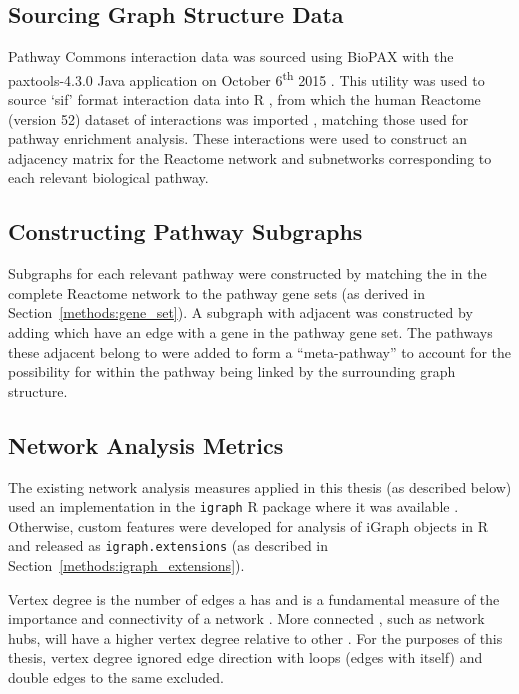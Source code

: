 \subsection{Sourcing Graph Structure Data} \label{methods:graph_data}
Pathway Commons interaction data was sourced using \gls{BioPAX} with the paxtools-4.3.0 Java application on October 6\textsuperscript{th} 2015 \citep{PathwayCommons, paxtools}. This utility was used to source `sif' format interaction data into R \citep{R_core}, from which the human Reactome (version 52) dataset of interactions was imported \citep{Reactome}, matching those used for \gls{pathway} enrichment analysis. These interactions were used to construct an adjacency matrix for the Reactome network and subnetworks corresponding to each relevant biological \gls{pathway}. 

\subsection{Constructing Pathway Subgraphs} \label{methods:subgraphs}
Subgraphs for each relevant \gls{pathway} were constructed by matching the  in the complete Reactome network to the \gls{pathway} gene sets (as derived in Section~\ref{methods:gene_set}). A subgraph with adjacent  was constructed by adding  which have an \gls{edge} with a gene in the \gls{pathway} gene set. The \glspl{pathway} these adjacent  belong to were added to form a ``meta-\gls{pathway}'' to account for the possibility for  within the \gls{pathway} being linked by the surrounding \gls{graph} structure.

\subsection{Network Analysis Metrics} \label{methods:network_metrics}
The existing network analysis measures applied in this thesis (as described below) used an implementation in the \texttt{igraph} R package where it was available \citep{igraph}. Otherwise, custom features were developed for analysis of iGraph objects in R and released as \texttt{igraph.extensions} (as described in Section~\ref{methods:igraph_extensions}).

Vertex degree is the number of \glspl{edge} a  has and is a fundamental measure of the importance and connectivity of a network \citep{vanSteen2010}. More connected , such as network hubs, will have a higher \gls{vertex} degree relative to other . For the purposes of this thesis, \gls{vertex} degree ignored \gls{edge} direction with loops (edges with itself) and double \glspl{edge} to the same  excluded.

